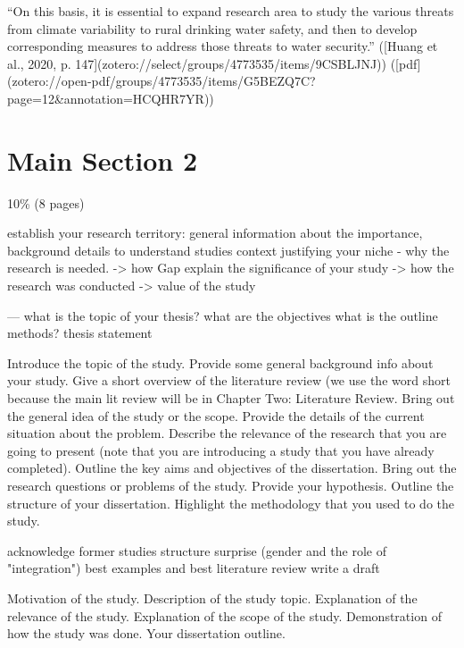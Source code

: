 “On this basis, it is essential to expand research area to study the various threats from climate variability to rural drinking water safety, and then to develop corresponding measures to address those threats to water security.” ([Huang et al., 2020, p. 147](zotero://select/groups/4773535/items/9CSBLJNJ)) ([pdf](zotero://open-pdf/groups/4773535/items/G5BEZQ7C?page=12&annotation=HCQHR7YR))

\section{Main Section 2}

10\% (8 pages)

establish your research territory: general information about the importance, background details to understand studies context
justifying your niche - why the research is needed. -> how Gap
explain the significance of your study -> how the research was conducted -> value of the study

---
what is the topic of your thesis?
what are the objectives
what is the outline
methods?
thesis statement

Introduce the topic of the study.
Provide some general background info about your study.
Give a short overview of the literature review (we use the word short because the main lit review will be in Chapter Two: Literature Review.
Bring out the general idea of the study or the scope.
Provide the details of the current situation about the problem.
Describe the relevance of the research that you are going to present (note that you are introducing a study that you have already completed).
Outline the key aims and objectives of the dissertation.
Bring out the research questions or problems of the study.
Provide your hypothesis.
Outline the structure of your dissertation.
Highlight the methodology that you used to do the study.


acknowledge former studies
structure 
surprise (gender and the role of "integration")
best examples and best literature review
write a draft

Motivation of the study.
Description of the study topic.
Explanation of the relevance of the study.
Explanation of the scope of the study.
Demonstration of how the study was done.
Your dissertation outline.



